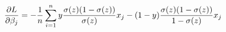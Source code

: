 \documentclass[preview]{standalone}
\begin{document}
\begin{align*}
\special{dvisvgm:raw <g id='unique000'>}\frac{\partial{L}}{\partial\beta_j}=-\frac{1}{n}\sum^n_{i=1}y\frac{\sigma(z)(1-\sigma(z))}{\sigma(z)}x_j-(1-y)\frac{\sigma(z)(1-\sigma(z))}{1-\sigma(z)}x_j\special{dvisvgm:raw </g>}
\end{align*}
\end{document}
